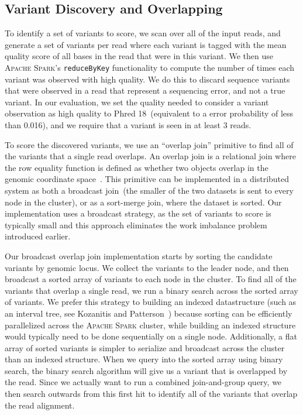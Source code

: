 \documentclass[phd]{ucbthesis}
\begin{document}
\subsection{Variant Discovery and Overlapping}
\label{sec:discovery}

To identify a set of variants to score, we scan over all of the input reads,
and generate a set of variants per read where each variant is tagged with the
mean quality score of all bases in the read that were in this variant. We then
use \textsc{Apache Spark}'s \texttt{reduceByKey} functionality to compute
the number of times each variant was observed with high quality. We do this
to discard sequence variants that were observed in a read that represent a
sequencing error, and not a true variant. In our evaluation, we set the quality
needed to consider a variant observation as high quality to Phred 18~(equivalent
to a error probability of less than 0.016), and we require that a variant is
seen in at least 3 reads.

To score the discovered variants, we use an ``overlap join'' primitive to
find all of the variants that a single read overlaps. An overlap join is a
relational join where the row equality function is defined as whether two
objects overlap in the genomic coordinate space~\cite{nothaft15}. This
primitive can be implemented in a distributed system as both a broadcast
join~(the smaller of the two datasets is sent to every node in the cluster),
or as a sort-merge join, where the dataset is sorted. Our implementation
uses a broadcast strategy, as the set of variants to score is typically small
and this approach eliminates the work imbalance problem introduced earlier.

Our broadcast overlap join implementation starts by sorting the candidate
variants by genomic locus. We collect the variants to the leader node, and
then broadcast a sorted array of variants to each node in the cluster. To
find all of the variants that overlap a single read, we run a binary search
across the sorted array of variants. We prefer this strategy to building
an indexed datastructure (such as an interval tree, see Kozanitis and Patterson~\cite{kozanitis16})
because sorting can be efficiently parallelized across the \textsc{Apache
Spark} cluster, while building an indexed structure would typically need to be
done sequentially on a single node. Additionally, a flat array of sorted
variants is simpler to serialize and broadcast across the cluster than an
indexed structure. When we query into the sorted array using binary search,
the binary search algorithm will give us a variant that is overlapped by
the read. Since we actually want to run a combined join-and-group query,
we then search outwards from this first hit to identify all of the variants
that overlap the read alignment.
\end{document}
